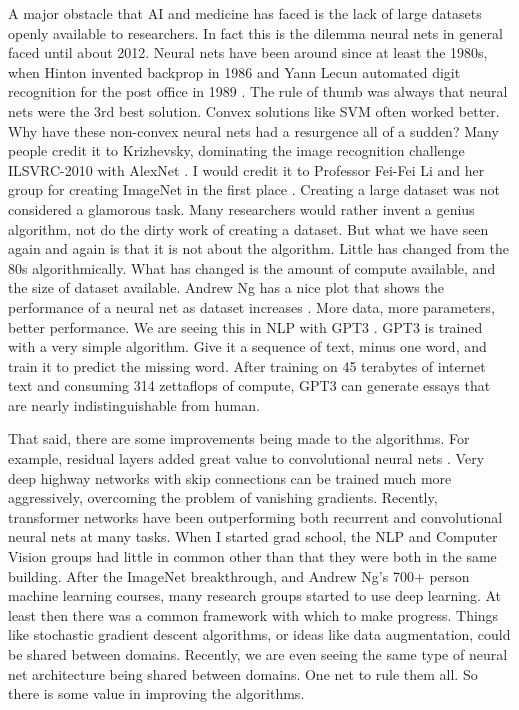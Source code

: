 A major obstacle that AI and medicine has faced is the lack of large datasets openly available to researchers.  In fact this is the dilemma neural nets in general faced until about 2012.  Neural nets have been around since at least the 1980s, when Hinton invented backprop in 1986 \cite{rumelhart1986learning} and Yann Lecun automated digit recognition for the post office in 1989 \cite{lecun1989backpropagation}.  The rule of thumb was always that neural nets were the 3rd best solution.  Convex solutions like SVM often worked better.  Why have these non-convex neural nets had a resurgence all of a sudden?  Many people credit it to Krizhevsky, dominating the image recognition challenge ILSVRC-2010 with AlexNet \cite{krizhevsky2012imagenet}.  I would credit it to Professor Fei-Fei Li and her group for creating ImageNet in the first place \cite{deng2009imagenet}.  Creating a large dataset was not considered a glamorous task.  Many researchers would rather invent a genius algorithm, not do the dirty work of creating a dataset.  But what we have seen again and again is that it is not about the algorithm.  Little has changed from the 80s algorithmically.  What has changed is the amount of compute available, and the size of dataset available.  Andrew Ng has a nice plot that shows the performance of a neural net as dataset increases \cite{ng2016nuts}.  More data, more parameters, better performance.  We are seeing this in NLP with GPT3 \cite{brown2020language}.  GPT3 is trained with a very simple algorithm.  Give it a sequence of text, minus one word, and train it to predict the missing word.  After training on 45 terabytes of internet text and consuming 314 zettaflops of compute, GPT3 can generate essays that are nearly indistinguishable from human.

That said, there are some improvements being made to the algorithms.  For example, residual layers added great value to convolutional neural nets \cite{he2016deep}.  Very deep highway networks with skip connections can be trained much more aggressively, overcoming the problem of vanishing gradients.  Recently, transformer networks have been outperforming both recurrent and convolutional neural nets at many tasks.  When I started grad school, the NLP and Computer Vision groups had little in common other than that they were both in the same building.  After the ImageNet breakthrough, and Andrew Ng's 700+ person machine learning courses, many research groups started to use deep learning.  At least then there was a common framework with which to make progress.  Things like stochastic gradient descent algorithms, or ideas like data augmentation, could be shared between domains.  Recently, we are even seeing the same type of neural net architecture being shared between domains.  One net to rule them all.  So there is some value in improving the algorithms.  

